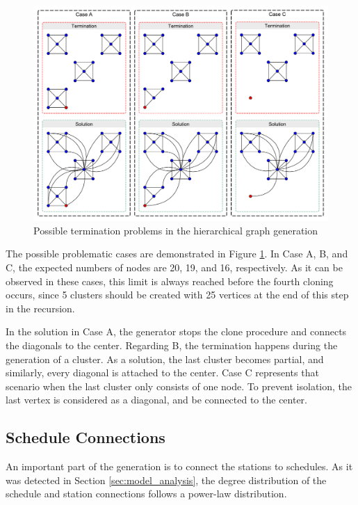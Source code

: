 \begin{figure}[!ht]
	\centering
	\includegraphics[width=150mm, keepaspectratio]{figures/hierarchical.pdf}
	\caption{Possible termination problems in the hierarchical graph generation}
	\label{fig:hierarchical_problems}
\end{figure}

The possible problematic cases are demonstrated in Figure \ref{fig:hierarchical_problems}. In \textsf{Case A}, \textsf{B}, and \textsf{C}, the expected numbers of nodes are 20, 19, and 16, respectively. As it can be observed in these cases, this limit is always reached before the fourth cloning occurs, since 5 clusters should be created with 25 vertices at the end of this step in the recursion.

In the solution in \textsf{Case A}, the generator stops the clone procedure and connects the diagonals to the center. Regarding \textsf{B}, the termination happens during the generation of a cluster. As a solution, the last cluster becomes partial, and similarly, every diagonal is attached to the center. \textsf{Case C} represents that scenario when the last cluster only consists of one node. To prevent isolation, the last vertex is considered as a diagonal, and be connected to the center.

\subsection{Schedule Connections}\label{sec:schedule_connections}

An important part of the generation is to connect the stations to schedules. As it was detected in Section \ref{sec:model_analysis}, the degree distribution of the schedule and station connections follows a power-law distribution. %

